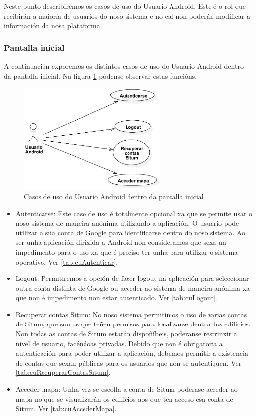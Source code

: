 Neste punto describiremos os casos de uso do Usuario Android. Este é o rol que recibirán a maioría de usuarios do noso sistema e no cal non poderán modificar a información da nosa plataforma.

\subsubsection{Pantalla inicial}
A continuación exporemos os distintos casos de uso do Usuario Android dentro da pantalla inicial. Na figura \ref{fig:cuUsuarioAndroidPantallaInicial} pódense observar estas funcións.

\begin{figure}[tb] 
	\begin{center}
		\includegraphics[width=0.65\textwidth]{figures/CasosUso/UsuarioAndroidPantallaInicial}
		\caption{Casos de uso do Usuario Android dentro da pantalla inicial}
		\label{fig:cuUsuarioAndroidPantallaInicial}
	\end{center}
\end{figure}

\begin{itemize}
	\item Autenticarse: Este caso de uso é totalmente opcional xa que se permite usar o noso sistema de maneira anónima utilizando a aplicación. O usuario pode utilizar a súa conta de Google para identificarse dentro do noso sistema. Ao ser unha aplicación dirixida a Android non consideramos que sexa un impedimento para o uso xa que é preciso ter unha para utilizar o sistema operativo. Ver \ref{tab:cuAutenticar}.
	\item Logout: Permitiremos a opción de facer logout na aplicación para seleccionar outra conta distinta de Google ou acceder ao sistema de maneira anónima xa que non é impedimento non estar autenticado. Ver \ref{tab:cuLogout}.
	\item Recuperar contas Situm: No noso sistema permitimos o uso de varias contas de Situm, que son as que teñen permisos para localizarse dentro dos edificios. Non todas as contas de Situm estarán dispoñíbeis, poderanse restrinxir a nivel de usuario, facéndoas privadas. Debido que non é obrigatoria a autenticación para poder utilizar a aplicación, debemos permitir a existencia de contas que sexan públicas para os usuarios que non se autentiquen. Ver \ref{tab:cuRecuperarContasSitum}.
	\item Acceder mapa: Unha vez se escolla a conta de Situm poderase acceder ao mapa no que se visualizarán os edificios aos que ten acceso esa conta de Situm. Ver \ref{tab:cuAccederMapa}.
\end{itemize}


